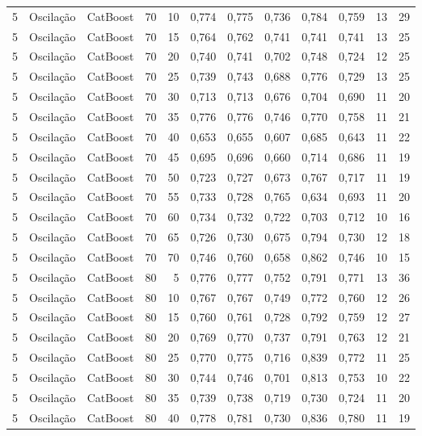 \begin{longtable}{@{}rllrrrrrrrrr@{}}
5 & Oscilação & CatBoost & 70 & 10 & 0,774 & 0,775 & 0,736 & 0,784 & 0,759 & 13 & 29 \\
5 & Oscilação & CatBoost & 70 & 15 & 0,764 & 0,762 & 0,741 & 0,741 & 0,741 & 13 & 25 \\
5 & Oscilação & CatBoost & 70 & 20 & 0,740 & 0,741 & 0,702 & 0,748 & 0,724 & 12 & 25 \\
5 & Oscilação & CatBoost & 70 & 25 & 0,739 & 0,743 & 0,688 & 0,776 & 0,729 & 13 & 25 \\
5 & Oscilação & CatBoost & 70 & 30 & 0,713 & 0,713 & 0,676 & 0,704 & 0,690 & 11 & 20 \\
5 & Oscilação & CatBoost & 70 & 35 & 0,776 & 0,776 & 0,746 & 0,770 & 0,758 & 11 & 21 \\
5 & Oscilação & CatBoost & 70 & 40 & 0,653 & 0,655 & 0,607 & 0,685 & 0,643 & 11 & 22 \\
5 & Oscilação & CatBoost & 70 & 45 & 0,695 & 0,696 & 0,660 & 0,714 & 0,686 & 11 & 19 \\
5 & Oscilação & CatBoost & 70 & 50 & 0,723 & 0,727 & 0,673 & 0,767 & 0,717 & 11 & 19 \\
5 & Oscilação & CatBoost & 70 & 55 & 0,733 & 0,728 & 0,765 & 0,634 & 0,693 & 11 & 20 \\
5 & Oscilação & CatBoost & 70 & 60 & 0,734 & 0,732 & 0,722 & 0,703 & 0,712 & 10 & 16 \\
5 & Oscilação & CatBoost & 70 & 65 & 0,726 & 0,730 & 0,675 & 0,794 & 0,730 & 12 & 18 \\
5 & Oscilação & CatBoost & 70 & 70 & 0,746 & 0,760 & 0,658 & 0,862 & 0,746 & 10 & 15 \\
5 & Oscilação & CatBoost & 80 & 5 & 0,776 & 0,777 & 0,752 & 0,791 & 0,771 & 13 & 36 \\
5 & Oscilação & CatBoost & 80 & 10 & 0,767 & 0,767 & 0,749 & 0,772 & 0,760 & 12 & 26 \\
5 & Oscilação & CatBoost & 80 & 15 & 0,760 & 0,761 & 0,728 & 0,792 & 0,759 & 12 & 27 \\
5 & Oscilação & CatBoost & 80 & 20 & 0,769 & 0,770 & 0,737 & 0,791 & 0,763 & 12 & 21 \\
5 & Oscilação & CatBoost & 80 & 25 & 0,770 & 0,775 & 0,716 & 0,839 & 0,772 & 11 & 25 \\
5 & Oscilação & CatBoost & 80 & 30 & 0,744 & 0,746 & 0,701 & 0,813 & 0,753 & 10 & 22 \\
5 & Oscilação & CatBoost & 80 & 35 & 0,739 & 0,738 & 0,719 & 0,730 & 0,724 & 11 & 20 \\
5 & Oscilação & CatBoost & 80 & 40 & 0,778 & 0,781 & 0,730 & 0,836 & 0,780 & 11 & 19 \\

\end{longtable}
